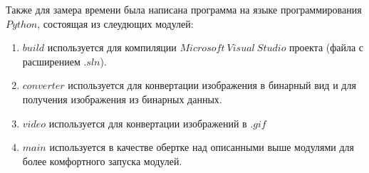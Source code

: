 Также для замера времени была написана программа на языке программирования $Python$, состоящая из слеудющих модулей:
\begin{enumerate}
    \item $build$ используется для компиляции $Microsoft\:Visual\:Studio$ проекта (файла с расширением $.sln$).
    \item $converter$ используется для конвертации изображения в бинарный вид и для получения изображения из бинарных данных.
    \item $video$ используется для конвертации изображений в $.gif$
    \item $main$ используется в качестве обертке над описанными выше модулями для более комфортного запуска модулей.
\end{enumerate}